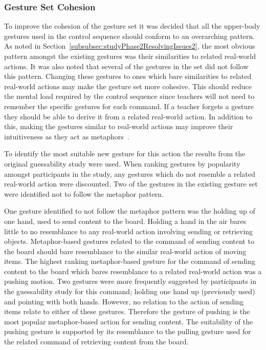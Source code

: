 \documentclass[link]{IWCOMP}
\begin{document}
\subsubsection{Gesture Set Cohesion} 
\label{subsubsec:studyPhase2ImplementationGestureSet}

To improve the cohesion of the gesture set it was decided that all the upper-body gestures used in the control sequence should conform to an overarching pattern.
As noted in Section~\ref{subsubsec:studyPhase2ResolvingIssues2}, the most obvious pattern amongst the existing gestures was their similarities to related real-world actions.
It was also noted that several of the gestures in the set did not follow this pattern.
Changing these gestures to ones which bare similarities to related real-world actions may make the gesture set more cohesive.
This should reduce the mental load required by the control sequence since teachers will not need to remember the specific gestures for each command.
If a teacher forgets a gesture they should be able to derive it from a related real-world action.
In addition to this, making the gestures similar to real-world actions may improve their intuitiveness as they act as metaphors~\cite{Wang2008}.

To identify the most suitable new gesture for this action the results from the original guessability study were used.
When ranking gestures by popularity amongst participants in the study, any gestures which do not resemble a related real-world action were discounted.
Two of the gestures in the existing gesture set were identified not to follow the metaphor pattern.

One gesture identified to not follow the metaphor pattern was the holding up of one hand, used to send content to the board.
Holding a hand in the air bares little to no resemblance to any real-world action involving sending or retrieving objects.
Metaphor-based gestures related to the command of sending content to the board should bare resemblance to the similar real-world action of moving items.
The highest ranking metaphor-based gesture for the command of sending content to the board which bares resemblance to a related real-world action was a pushing motion.
Two gestures were more frequently suggested by participants in the guessability study for this command; holding one hand up (previously used) and pointing with both hands.
However, no relation to the action of sending items relate to either of these gestures.
Therefore the gesture of pushing is the most popular metaphor-based action for sending content.
The suitability of the pushing gesture is supported by its resemblance to the pulling gesture used for the related command of retrieving content from the board.
\end{document}
